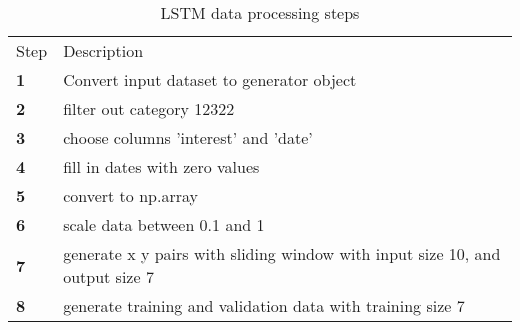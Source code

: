 \begin{table}[h]
  \caption{LSTM data processing steps}
  \label{table:lstm_data_processing_steps}
  \begin{tabular}{ll}
    \toprule
    Step       & Description                                                                  \\
    \textbf{1} & Convert input dataset to generator object                                    \\
    \textbf{2} & filter out category 12322                                                    \\
    \textbf{3} & choose columns 'interest' and 'date'                                         \\
    \textbf{4} & fill in dates with zero values                                               \\
    \textbf{5} & convert to np.array                                                          \\
    \textbf{6} & scale data between 0.1 and 1                                                 \\
    \textbf{7} & generate x y pairs with sliding window with input size 10, and output size 7 \\
    \textbf{8} & generate training and validation data with training size 7                   \\
    \bottomrule
  \end{tabular}
\end{table}


